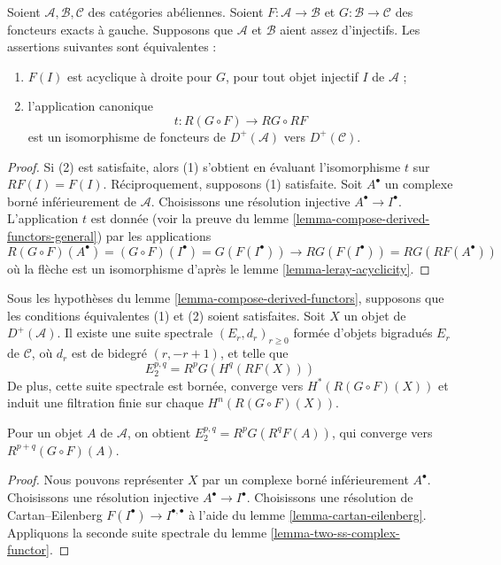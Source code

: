 \begin{lemma}
\label{lemma-compose-derived-functors}
Soient $\mathcal{A}, \mathcal{B}, \mathcal{C}$ des catégories abéliennes.
Soient $F : \mathcal{A} \to \mathcal{B}$ et
$G : \mathcal{B} \to \mathcal{C}$ des foncteurs exacts à gauche. Supposons
que $\mathcal{A}$ et $\mathcal{B}$ aient assez d'injectifs. Les assertions
suivantes sont équivalentes :
\begin{enumerate}
\item $F(I)$ est acyclique à droite pour $G$, pour tout objet injectif $I$
de $\mathcal{A}$ ;
\item l'application canonique
$$
t : R(G \circ F) \longrightarrow RG \circ RF
$$
est un isomorphisme de foncteurs de $D^{+}(\mathcal{A})$ vers
$D^{+}(\mathcal{C})$.
\end{enumerate}
\end{lemma}

\begin{proof}
Si (2) est satisfaite, alors (1) s'obtient en évaluant l'isomorphisme $t$ sur
$RF(I) = F(I)$. Réciproquement, supposons (1) satisfaite.
Soit $A^\bullet$ un complexe borné inférieurement de $\mathcal{A}$.
Choisissons une résolution injective $A^\bullet \to I^\bullet$.
L'application $t$ est donnée (voir la preuve du
lemme \ref{lemma-compose-derived-functors-general}) par les applications
$$
R(G \circ F)(A^\bullet) =
(G \circ F)(I^\bullet) =
G(F(I^\bullet)) \to
RG(F(I^\bullet)) =
RG(RF(A^\bullet))
$$
où la flèche est un isomorphisme d'après le
lemme \ref{lemma-leray-acyclicity}.
\end{proof}

\begin{lemma}
\label{lemma-grothendieck-spectral-sequence}
Sous les hypothèses du lemme \ref{lemma-compose-derived-functors}, supposons
que les conditions équivalentes (1) et (2) soient satisfaites.
Soit $X$ un objet de $D^{+}(\mathcal{A})$.
Il existe une suite spectrale $(E_r, d_r)_{r \geq 0}$ formée d'objets
bigradués $E_r$ de $\mathcal{C}$, où $d_r$ est de bidegré $(r, - r + 1)$,
et telle que
$$
E_2^{p, q} = R^pG(H^q(RF(X)))
$$
De plus, cette suite spectrale est bornée, converge vers
$H^*(R(G \circ F)(X))$ et induit une filtration finie sur chaque
$H^n(R(G \circ F)(X))$.
\end{lemma}

\noindent
Pour un objet $A$ de $\mathcal{A}$, on obtient
$E_2^{p, q} = R^pG(R^qF(A))$, qui converge vers
$R^{p + q}(G \circ F)(A)$.

\begin{proof}
Nous pouvons représenter $X$ par un complexe borné inférieurement
$A^\bullet$. Choisissons une résolution injective
$A^\bullet \to I^\bullet$. Choisissons une résolution de Cartan--Eilenberg
$F(I^\bullet) \to I^{\bullet, \bullet}$ à l'aide du
lemme \ref{lemma-cartan-eilenberg}. Appliquons la seconde suite spectrale du
lemme \ref{lemma-two-ss-complex-functor}.
\end{proof}



